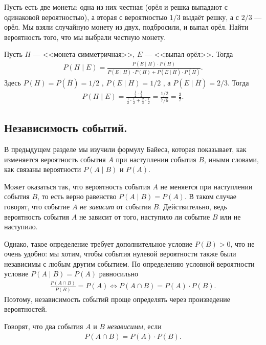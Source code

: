 \documentclass[../main.tex]{subfiles}
\begin{document}
\begin{exmpl*}
 Пусть есть две монеты: одна из них честная (орёл и решка выпадают с одинаковой вероятностью), а вторая с вероятностью $1 / 3$ выдаёт решку, а с $2 / 3$ --- орёл. Мы взяли случайную монету из двух, подбросили, и выпал орёл. Найти вероятность того, что мы выбрали честную монету.

 Пусть $H$ --- <<монета симметричная>>, $E$ --- <<выпал орёл>>. Тогда
 \begin{align*}
  P(H\mid E) = \frac{P(E\mid H) \cdot P(H)}{P(E\mid H) \cdot P(H) + P(E\mid \overline H) \cdot P(\overline H)}.
 \end{align*} Здесь $ P(H) = P(\overline H) = 1/2 $ , $ P(E \mid H) = 1 / 2 $ , а $ P(E \mid \overline H) = 2 / 3 $. Тогда
 \begin{align*}
  P(H\mid E) = \frac{\frac{1}{2} \cdot \frac{1}{2}}{\frac{1}{2} \cdot \frac{1}{2} + \frac{2}{3} \cdot \frac{1}{2}} = \frac{1 / 2}{7 / 6} = \frac{3}{7}.
 \end{align*}
\end{exmpl*}

\subsection{Независимость событий.}

В предыдущем разделе мы изучили формулу Байеса, которая показывает, как изменяется вероятность события $ A $ при наступлении события $ B $, иными словами, как связаны вероятности $ P(A \mid B) $ и $ P(A) $.

Может оказаться так, что вероятность события $ A $ не меняется при наступлении события $ B $, то есть верно равенство $ P(A \mid B) = P(A) $. В таком случае говорят, что событие $ A $ \textit{не зависит} от события $ B $. Действительно, ведь вероятность события $ A $ не зависит от того, наступило ли событие $ B $ или не наступило.

Однако, такое определение требует дополнительное условие $ P(B) > 0 $, что не очень удобно: мы хотим, чтобы события нулевой вероятности также были независимы с любым другим событием. По определению условной вероятности условие $ P(A \mid B) = P(A) $ равносильно
\begin{align*}
 \frac{P(A \cap B)}{P(B)} = P(A) \iff P(A \cap B) = P(A) \cdot P(B).
\end{align*} Поэтому, независимость событий проще определять через произведение вероятностей.

\begin{df}
 \label{def:elem_independent}
 Говорят, что два события $ A $ и $ B $ \textit{независимы}, если
 \begin{align*}
  P(A \cap B) = P(A) \cdot P(B).
 \end{align*}
\end{df}
\end{document}
